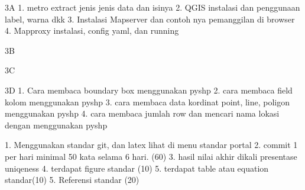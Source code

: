 3A
1. metro extract jenis jenis data dan isinya 
2. QGIS instalasi dan penggunaan label, warna dkk
3. Instalasi Mapserver dan contoh nya pemanggilan di browser
4. Mapproxy instalasi, config yaml, dan running

3B

3C

3D
1. Cara membaca boundary box menggunakan pyshp
2. cara membaca field kolom menggunakan pyshp
3. cara membaca data kordinat point, line, poligon menggunakan pyshp
4. cara membaca jumlah row dan mencari nama lokasi dengan menggunakan pyshp



1. Menggunakan standar git, dan latex lihat di menu standar portal
2. commit 1 per hari minimal 50 kata selama 6 hari. (60)
3. hasil nilai akhir dikali presentase uniqeness
4. terdapat figure standar (10)
5. terdapat table atau equation standar(10)
5. Referensi standar (20)